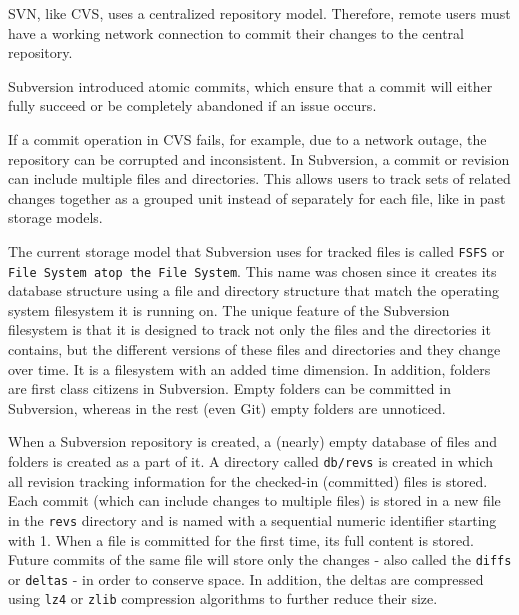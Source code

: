 
SVN, like CVS, uses a centralized repository model. Therefore, remote users must have a working network connection to commit their changes to the central repository.

Subversion introduced atomic commits, which ensure that a commit will either fully succeed or be completely abandoned if an issue occurs.


If a commit operation in CVS fails, for example, due to a network outage, the repository can be corrupted and inconsistent. In Subversion, a commit or revision can include multiple files and directories. This allows users to track sets of related changes together as a grouped unit instead of separately for each file, like in past storage models.

The current storage model that Subversion uses for tracked files is called \lstinline{FSFS} or \lstinline{File System atop the File System}. This name was chosen since it creates its database structure using a file and directory structure that match the operating system filesystem it is running on. The unique feature of the Subversion filesystem is that it is designed to track not only the files and the directories it contains, but the different versions of these files and directories and they change over time. It is a filesystem with an added time dimension. In addition, folders are first class citizens in Subversion. Empty folders can be committed in Subversion, whereas in the rest (even Git) empty folders are unnoticed.

When a Subversion repository is created, a (nearly) empty database of files and folders is created as a part of it. A directory called \lstinline{db/revs} is created in which all revision tracking information for the checked-in (committed) files is stored. Each commit (which can include changes to multiple files) is stored in a new file in the \lstinline{revs} directory and is named with a sequential numeric identifier starting with 1. When a file is committed for the first time, its full content is stored. Future commits of the same file will store only the changes - also called the \lstinline{diffs} or \lstinline{deltas} - in order to conserve space. In addition, the deltas are compressed using \lstinline{lz4} or \lstinline{zlib} compression algorithms to further reduce their size.

